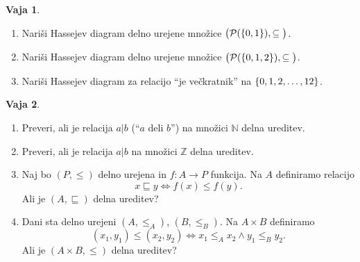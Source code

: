 \documentclass{article}
\newcommand{\NN}{\mathbb{N}}
\newcommand{\ZZ}{\mathbb{Z}}
\theoremstyle{definition}
\newtheorem{vaja}{Vaja}
\begin{document}
\begin{vaja}
  \begin{enumerate}
    \item
      Nariši Hassejev diagram delno urejene množice $\big(\mathcal{P}(\set{0, 1}), \subseteq\big)$.
    \item
      Nariši Hassejev diagram delno urejene množice $\big(\mathcal{P}(\set{0, 1, 2}), \subseteq\big)$.
    \item
      Nariši Hassejev diagram za relacijo "`je večkratnik"' na $\set{0, 1, 2, \ldots, 12}$.
  \end{enumerate}
\end{vaja}

\begin{vaja}
  \begin{enumerate}
    \item
      Preveri, ali je relacija $a | b$ ("`$a$ deli $b$"') na množici $\NN$ delna ureditev.
    \item
      Preveri, ali je relacija $a | b$ na množici $\ZZ$ delna ureditev.
    \item
      Naj bo $(P, \leq)$ delno urejena in $f\colon A \to P$ funkcija. Na $A$ definiramo relacijo
      \begin{equation*}
        x \sqsubseteq y \iff f(x) \leq f(y).
      \end{equation*}
      Ali je $(A, \sqsubseteq)$ delna ureditev?
    \item
      Dani sta delno urejeni $(A, \leq_A)$, $(B, \leq_B)$. Na $A \times B$ definiramo
      \begin{equation*}
        (x_1, y_1) \leq (x_2, y_2) \iff x_1 \leq_A x_2 \land y_1 \leq_B y_2.
      \end{equation*}
      Ali je $(A \times B, \leq)$ delna ureditev?
  \end{enumerate}
\end{vaja}
\end{document}
